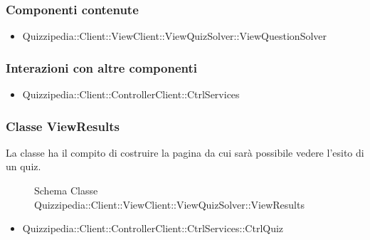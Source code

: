 \subsubsection{Componenti contenute}
\begin{itemize}
\item Quizzipedia::Client::ViewClient::ViewQuizSolver::ViewQuestionSolver
\end{itemize}
\subsubsection{Interazioni con altre componenti}
\begin{itemize}
\item Quizzipedia::Client::ControllerClient::CtrlServices
\end{itemize}
\subsubsection{Classe ViewResults}
La classe ha il compito di costruire la pagina da cui sarà possibile vedere l'esito di un quiz.
\begin{figure}[H]
\centering
\noindent{}
\caption[Schema Classe ViewResults]{Schema Classe Quizzipedia::Client::ViewClient::ViewQuizSolver::ViewResults}
\end{figure}
\begin{itemize}
\item Quizzipedia::Client::ControllerClient::CtrlServices::CtrlQuiz
\end{itemize}

